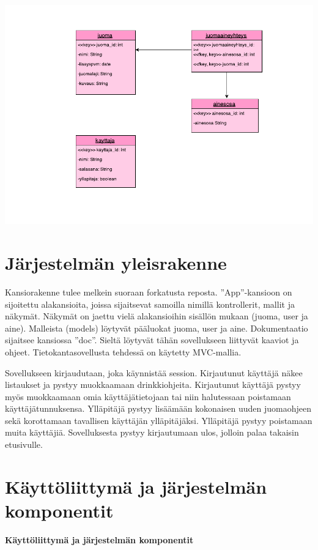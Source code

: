 \documentclass[a4paper]{article}
\begin{document}
\includegraphics[scale=0.8]{relaatiokaavio.pdf}


\section{Järjestelmän yleisrakenne}

Kansiorakenne tulee melkein suoraan forkatusta reposta. ”App”-kansioon on sijoitettu alakansioita, 
joissa sijaitsevat samoilla nimillä kontrollerit, mallit ja näkymät. Näkymät on jaettu vielä alakansioihin 
sisällön mukaan (juoma, user ja aine). Malleista (models) löytyvät pääluokat juoma, user ja aine. Dokumentaatio 
sijaitsee kansiossa ”doc”. Sieltä löytyvät tähän sovellukseen liittyvät kaaviot ja ohjeet. Tietokantasovellusta
tehdessä on käytetty MVC-mallia. 

Sovellukseen kirjaudutaan, joka käynnistää session. Kirjautunut käyttäjä näkee listaukset ja pystyy muokkaamaan 
drinkkiohjeita. Kirjautunut käyttäjä pystyy myös muokkaamaan omia käyttäjätietojaan tai niin halutessaan poistamaan käyttäjätunnuksensa. Ylläpitäjä pystyy lisäämään kokonaisen uuden juomaohjeen sekä korottamaan tavallisen käyttäjän 
ylläpitäjäksi. Ylläpitäjä pystyy poistamaan muita käyttäjiä. Sovelluksesta pystyy kirjautumaan ulos, jolloin palaa takaisin etusivulle. 



\newpage
\section{Käyttöliittymä ja järjestelmän komponentit}
\begin{flushleft}\textbf{Käyttöliittymä ja järjestelmän komponentit} \end{flushleft}
\end{document}
